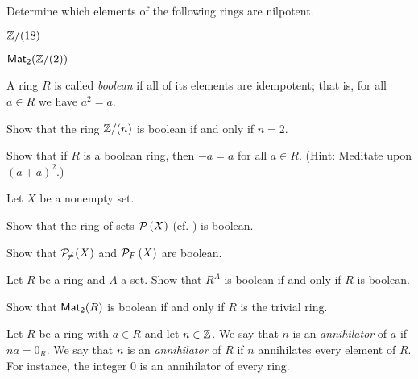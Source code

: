 \begin{exercise}
Determine which elements of the following rings are nilpotent.
\begin{proplist*}
\item \(\mathbb{Z}/(18)\)
\item \(\mathsf{Mat}_{2}(\mathbb{Z}/(2))\)
\end{proplist*}
\end{exercise}

\begin{dfn}
A ring \(R\) is called \emph{boolean}  if all of its elements are idempotent; that is, for all \(a \in R\) we have \(a^2 = a\).
\end{dfn}

\begin{exercise}
Show that the ring \(\mathbb{Z}/(n)\) is boolean if and only if \(n = 2\).
\end{exercise}

\begin{exercise}
Show that if \(R\) is a boolean ring, then \(-a = a\) for all \(a \in R\). (Hint: Meditate upon \((a+a)^2\).) \label{exerc:boolean-neg}
\end{exercise}

\begin{exercise}
Let \(X\) be a nonempty set.
\begin{proplist}
\item Show that the ring of sets \(\mathcal{P}\left(X\right)\) (cf. ) is boolean.
\item Show that \(\mathcal{P}_{\!\neq\!}\left(X\right)\) and \(\mathcal{P}_F\left(X\right)\) are boolean.
\end{proplist}
\end{exercise}

\begin{exercise}
Let \(R\) be a ring and \(A\) a set. Show that \(R^A\) is boolean if and only if \(R\) is boolean.
\end{exercise}

\begin{exercise}
Show that \(\mathsf{Mat}_{2}(R)\) is boolean if and only if \(R\) is the trivial ring.
\end{exercise}

\begin{dfn} \label{dfn:zz-annihilator}
Let \(R\) be a ring with \(a \in R\) and let \(n \in \mathbb{Z}\). We say that \(n\) is an \emph{annihilator} of \(a\) if \(na = 0_R\). We say that \(n\) is an \emph{annihilator}  of \(R\) if \(n\) annihilates every element of \(R\). For instance, the integer 0 is an annihilator of every ring.
\end{dfn}

